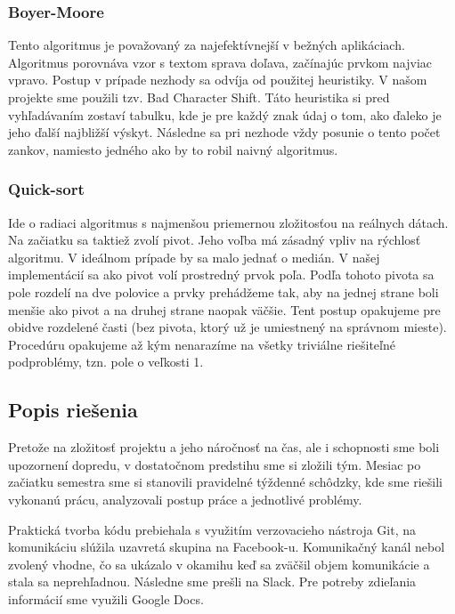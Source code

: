 \documentclass[12pt,a4paper,titlepage,final]{article}
\begin{document}
\subsubsection{Boyer-Moore}

Tento algoritmus je považovaný za najefektívnejší v bežných aplikáciach. Algoritmus porovnáva vzor s textom sprava doľava, začínajúc prvkom najviac vpravo. Postup v prípade nezhody sa odvíja od použitej heuristiky. V našom projekte sme použili tzv. Bad Character Shift. Táto heuristika si pred vyhľadávaním zostaví tabulku, kde je pre každý znak údaj o tom, ako ďaleko je jeho ďalší najbližší výskyt. Následne sa pri nezhode vždy posunie o tento počet zankov, namiesto jedného ako by to robil naivný algoritmus.  

\subsubsection{Quick-sort}

Ide o radiaci algoritmus s najmenšou priemernou zložitosťou na reálnych dátach. Na začiatku sa taktiež zvolí pivot. Jeho voľba má zásadný vpliv na rýchlosť algoritmu. V ideálnom prípade by sa malo jednať o medián. V našej implementácií sa ako pivot volí prostredný prvok poľa. Podľa tohoto pivota sa pole rozdelí na dve polovice a prvky prehádžeme tak, aby na jednej strane boli menšie ako pivot a na druhej strane naopak väčšie. Tent postup opakujeme pre obidve rozdelené časti (bez pivota, ktorý už je umiestnený na správnom mieste). Procedúru opakujeme až kým nenarazíme na všetky triviálne riešiteľné podproblémy, tzn. pole o veľkosti 1. 

\subsection{Popis riešenia}

Pretože na zložitosť projektu a jeho náročnosť na čas, ale i schopnosti sme boli upozornení dopredu, v dostatočnom predstihu sme si zložili tým. Mesiac po začiatku semestra sme si stanovili pravidelné týždenné schôdzky, kde sme riešili vykonanú prácu, analyzovali postup práce a jednotlivé problémy. 

Praktická tvorba kódu prebiehala s využitím verzovacieho nástroja Git, na komunikáciu slúžila uzavretá skupina na Facebook-u. Komunikačný kanál nebol zvolený vhodne, čo sa ukázalo v okamihu keď sa zväčšil objem komunikácie a stala sa neprehľadnou. Následne sme prešli na Slack. Pre potreby zdieľania informácií sme využili Google Docs.
\end{document}
